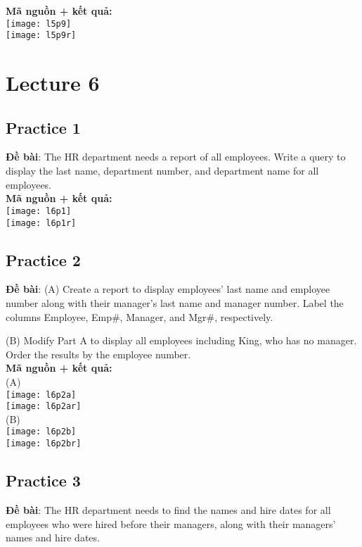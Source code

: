 \documentclass[a4paper]{report}
\begin{document}
\textbf{Mã nguồn + kết quả: }\\
\texttt{[image: l5p9]}\\
\texttt{[image: l5p9r]}

\section{Lecture 6}
\subsection{Practice 1}
\noindent
\textbf{Đề bài}: The HR department needs a report of all employees. Write a query to display the last name, department number, and department name for all employees.\\

\textbf{Mã nguồn + kết quả: }\\
\texttt{[image: l6p1]}\\
\texttt{[image: l6p1r]}

\subsection{Practice 2}
\noindent
\textbf{Đề bài}: (A) Create a report to display employees’ last name and employee number along with their manager’s last name and manager number. Label the columns Employee, Emp\#, Manager, and Mgr\#, respectively.\par
(B) Modify Part A to display all employees including King, who has no manager. Order
the results by the employee number.\\

\textbf{Mã nguồn + kết quả: }\\

(A)\\
\texttt{[image: l6p2a]}\\
\texttt{[image: l6p2ar]}\\

(B)\\
\texttt{[image: l6p2b]}\\
\texttt{[image: l6p2br]}



\subsection{Practice 3}
\noindent
\textbf{Đề bài}: The HR department needs to find the names and hire dates for all employees who were hired before their managers, along with their managers’ names and hire dates.\\
\end{document}
